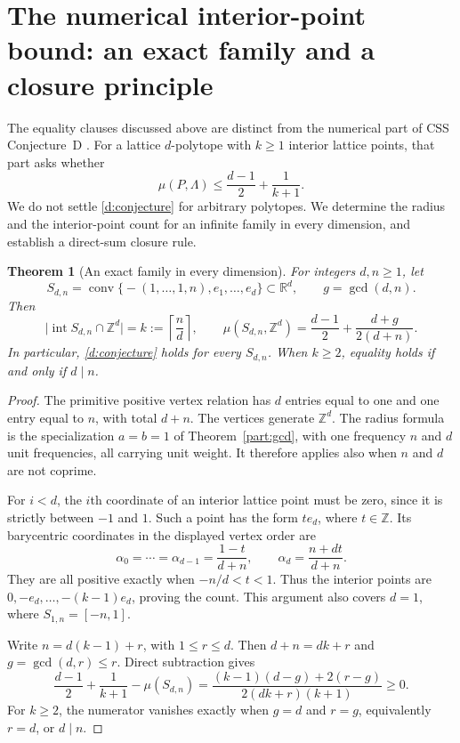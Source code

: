\documentclass[11pt,a4paper]{article}
\newtheorem{theorem}{Theorem}[section]
\theoremstyle{remark}\newtheorem{remark}[theorem]{Remark}
\DeclareMathOperator{\conv}{conv}
\DeclareMathOperator{\inter}{int}
\newcommand{\R}{\mathbb R}\newcommand{\Z}{\mathbb Z}
\begin{document}
\section{The numerical interior-point bound: an exact family and a closure principle}
\label{d:section}

The equality clauses discussed above are distinct from the numerical
part of CSS Conjecture~D \cite{CSS}. For a lattice $d$-polytope with
$k\ge1$ interior lattice points, that part asks whether
\begin{equation}\label{d:conjecture}
 \mu(P,\Lambda)\le\frac{d-1}{2}+\frac1{k+1}.
\end{equation}
We do not settle \eqref{d:conjecture} for arbitrary polytopes.
We determine the radius and the interior-point count for an infinite
family in every dimension, and establish a direct-sum closure rule.

\begin{theorem}[An exact family in every dimension]\label{d:family}
For integers $d,n\ge1$, let
\[
 S_{d,n}=\conv\bigl\{-(1,\ldots,1,n),e_1,\ldots,e_d\bigr\}
 \subset\R^d,
 \qquad g=\gcd(d,n).
\]
Then
\begin{equation}\label{d:exact}
 \bigl|\inter S_{d,n}\cap\Z^d\bigr|
 =k:=\left\lceil\frac nd\right\rceil,
 \qquad
 \mu(S_{d,n},\Z^d)
 =\frac{d-1}{2}+\frac{d+g}{2(d+n)}.
\end{equation}
In particular, \eqref{d:conjecture} holds for every $S_{d,n}$.
When $k\ge2$, equality holds if and only if $d\mid n$.
\end{theorem}
\begin{proof}
The primitive positive vertex relation has $d$ entries equal to
one and one entry equal to $n$, with total $d+n$. The vertices
generate $\Z^d$. The radius formula is the specialization $a=b=1$
of Theorem~\ref{part:gcd}, with one frequency $n$ and $d$ unit
frequencies, all carrying unit weight. It therefore applies also
when $n$ and $d$ are not coprime.

For $i<d$, the $i$th coordinate of an interior lattice point must
be zero, since it is strictly between $-1$ and $1$. Such a point
has the form $t e_d$, where $t\in\Z$. Its barycentric coordinates
in the displayed vertex order are
\[
 \alpha_0=\cdots=\alpha_{d-1}=\frac{1-t}{d+n},
 \qquad \alpha_d=\frac{n+dt}{d+n}.
\]
They are all positive exactly when $-n/d<t<1$. Thus the interior
points are $0,-e_d,\ldots,-(k-1)e_d$, proving the count. This
argument also covers $d=1$, where $S_{1,n}=[-n,1]$.

Write $n=d(k-1)+r$, with $1\le r\le d$. Then
$d+n=dk+r$ and $g=\gcd(d,r)\le r$. Direct subtraction gives
\begin{equation}\label{d:gap}
 \frac{d-1}{2}+\frac1{k+1}-\mu(S_{d,n})
 =\frac{(k-1)(d-g)+2(r-g)}{2(dk+r)(k+1)}\ge0.
\end{equation}
For $k\ge2$, the numerator vanishes exactly when $g=d$ and $r=g$,
equivalently $r=d$, or $d\mid n$.
\end{proof}
\end{document}

